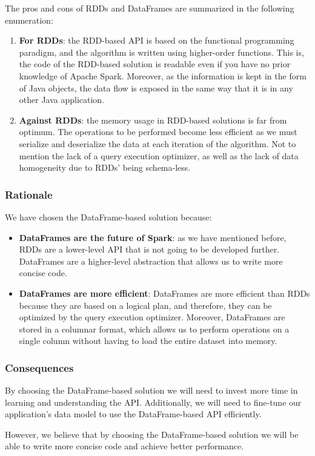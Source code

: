 The pros and cons of RDDs and DataFrames are summarized in the following enumeration:

\begin{enumerate}
    \itemsep0.5em
    \item \textbf{For RDDs}: the RDD-based API is based on the functional programming paradigm, and the algorithm is written using higher-order functions. This is, the code of the RDD-based solution is readable even if you have no prior knowledge of Apache Spark. Moreover, as the information is kept in the form of Java objects, the data flow is exposed in the same way that it is in any other Java application.
    \item \textbf{Against RDDs}: the memory usage in RDD-based solutions is far from optimum. The operations to be performed become less efficient as we must serialize and deserialize the data at each iteration of the algorithm. Not to mention the lack of a query execution optimizer, as well as the lack of data homogeneity due to RDDs' being schema-less.
\end{enumerate}

\subsubsection{Rationale}

We have chosen the DataFrame-based solution because:

\begin{itemize}
    \itemsep0.5em
    \item \textbf{DataFrames are the future of Spark}: as we have mentioned before, RDDs are a lower-level API that is not going to be developed further. DataFrames are a higher-level abstraction that allows us to write more concise code.
    \item \textbf{DataFrames are more efficient}: DataFrames are more efficient than RDDs because they are based on a logical plan, and therefore, they can be optimized by the query execution optimizer. Moreover, DataFrames are stored in a columnar format, which allows us to perform operations on a single column without having to load the entire dataset into memory.
\end{itemize}

\subsubsection{Consequences}

By choosing the DataFrame-based solution we will need to invest more time in learning and understanding the API. Additionally, we will need to fine-tune our application's data model to use the DataFrame-based API efficiently.

However, we believe that by choosing the DataFrame-based solution we will be able to write more concise code and achieve better performance.